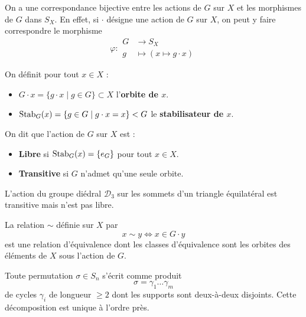 	\begin{theorem}
		On a une correspondance bijective entre les actions de $G$ sur $X$ et les morphismes de $G$ dans $S_X$. En effet, si $\cdot$ désigne une action de $G$ sur $X$, on peut y faire correspondre le morphisme
		\[ \varphi :
		\begin{array}{cl}
			G &\rightarrow S_X \\
			g &\mapsto (x \mapsto g \cdot x)
		\end{array}
		\]
	\end{theorem}

	\begin{definition}
		On définit pour tout $x \in X$ :
		\begin{itemize}
			\item $G \cdot x = \{ g \cdot x \mid g \in G \} \subset X$ l'\textbf{orbite de $x$}.
			\item $\operatorname{Stab}_G(x) = \{ g \in G \mid g \cdot x = x \} < G$ le \textbf{stabilisateur de $x$}.
		\end{itemize}
		On dit que l'action de $G$ sur $X$ est :
		\begin{itemize}
			\item \textbf{Libre} si $\operatorname{Stab}_G(x) = \{ e_G \}$ pour tout $x \in X$.
			\item \textbf{Transitive} si $G$ n'admet qu'une seule orbite.
		\end{itemize}
	\end{definition}

	\begin{example}
		L'action du groupe diédral $\mathcal{D}_3$ sur les sommets d'un triangle équilatéral est transitive mais n'est pas libre.
	\end{example}

	\begin{proposition}
		\label{101-1}
		La relation $\sim$ définie sur $X$ par
		\[ x \sim y \iff x \in G \cdot y \]
		est une relation d'équivalence dont les classes d'équivalence sont les orbites des éléments de $X$ sous l'action de $G$.
	\end{proposition}


	\begin{application}
		Toute permutation $\sigma \in S_n$ s'écrit comme produit
		\[ \sigma = \gamma_1 \dots \gamma_m \]
		de cycles $\gamma_i$ de longueur $\geq 2$ dont les supports sont deux-à-deux disjoints. Cette décomposition est unique à l'ordre près.
	\end{application}

